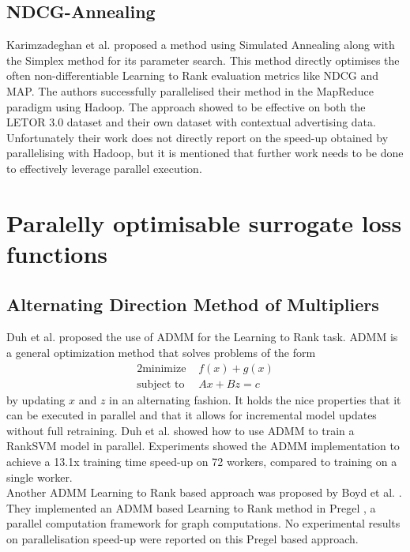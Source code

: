 \subsection{NDCG-Annealing}
Karimzadeghan et al. \cite{Karimzadehgan2011} proposed a method using Simulated Annealing along with the Simplex method for its parameter search. This method directly optimises the often non-differentiable Learning to Rank evaluation metrics like \ac{NDCG} and \ac{MAP}. The authors successfully parallelised their method in the MapReduce paradigm using Hadoop. The approach showed to be effective on both the LETOR 3.0 dataset and their own dataset with contextual advertising data. Unfortunately their work does not directly report on the speed-up obtained by parallelising  with Hadoop, but it is mentioned that further work needs to be done to effectively leverage parallel execution.\\

\section{Paralelly optimisable surrogate loss functions}
\subsection{Alternating Direction Method of Multipliers}
Duh et al. \cite{Duh2011} proposed the use of \ac{ADMM} for the Learning to Rank task. \ac{ADMM} is a general optimization method that solves problems of the form
\begin{alignat*}{2}
\text{minimize }   &  f(x) + g(x) \\
\text{subject to } &  Ax + Bz = c
\end{alignat*}
by updating $x$ and $z$ in an alternating fashion. It holds the nice properties that it can be executed in parallel and that it allows for incremental model updates without full retraining. Duh et al. \cite{Duh2011} showed how to use \ac{ADMM} to train a Rank\ac{SVM} \cite{Herbrich1999, Joachims2002} model in parallel. Experiments showed the \ac{ADMM} implementation to achieve a 13.1x training time speed-up on 72 workers, compared to training on a single worker.\\

Another \ac{ADMM} Learning to Rank based approach was proposed by Boyd et al. \cite{Boyd2012}. They implemented an \ac{ADMM} based Learning to Rank method in Pregel \cite{Malewicz2010}, a parallel computation framework for graph computations. No experimental results on parallelisation speed-up were reported on this Pregel based approach.
